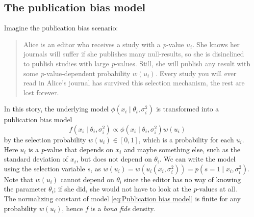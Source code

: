 \documentclass[useAMS,usenatbib,referee]{biom}
\newtheorem{prop}[theorem]{Proposition}
\begin{document}




\subsection{The publication bias model} \label{subsect:publicationBias}

Imagine the publication bias scenario:
\begin{quote}
Alice is an editor who receives a study with a \textit{p}-value $u_i$. She knows her journals will suffer if she publishes many null-results, so she is disinclined to publish studies with large \textit{p}-values. Still, she will publish any result with some \textit{p}-value-dependent probability $w(u_i)$. Every study you will ever read in Alice's journal has survived this selection mechanism, the rest are lost forever.
\end{quote}
In this story, the underlying model $\phi(x_{i}\mid\theta_{i},\sigma^2_{i})$ is transformed into a publication bias model
\vspace{-9mm}
\begin{equation}\label{eq:Publication bias model}
f(x_{i}\mid\theta_{i},\sigma^2_{i})\propto \phi(x_{i}\mid\theta_{i},\sigma^2_{i})w(u_i)
\end{equation}
by the selection probability $w(u_i) \in [0,1]$, which is a probability for each $u_i$. Here $u_i$ is a \textit{p}-value that depends on $x_{i}$ and maybe something else, such as the standard deviation of $x_{i}$, but does not depend on $\theta_{i}$. We can write the model using the selection variable $s$, as $w(u_i) = w(u_i(x_i, \sigma^2_i)) = p(s=1 \mid x_i, \sigma^2_i)$. Note that $w(u_i)$ cannot depend on $\theta_{i}$ since the editor has no way of knowing the parameter $\theta_{i}$; if she did, she would not have to look at the \textit{p}-values at all. The normalizing constant of model \eqref{eq:Publication bias model} is finite for any probability $w(u_i)$, hence $f$ is a \textit{bona fide} density.
\end{document}
